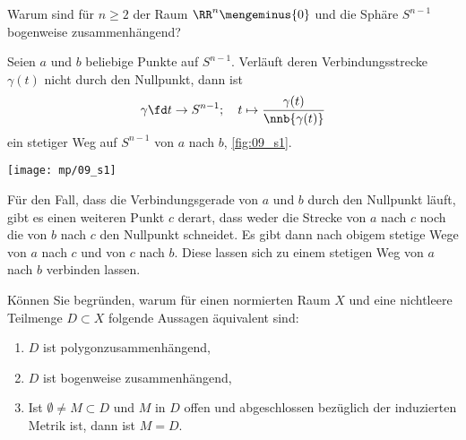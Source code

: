 \begin{frage}
  Warum sind für $n \ge 2$ der Raum $\RR^n \mengeminus \{ 0 \}$ und 
  die Sphäre $S^{n-1}$ bogenweise zusammenhängend?
\end{frage}

\begin{antwort}
  Seien $a$ und $b$ beliebige Punkte auf $S^{n-1}$. Verläuft 
  deren Verbindungsstrecke $\gamma(t)$ nicht durch den Nullpunkt, 
  dann ist 
  \[
  \gamma\fd t\to S^{n-1};\quad t \mapsto \frac{\gamma(t)}{ \nnb{\gamma(t)} } 
  \]
  ein stetiger Weg auf $S^{n-1}$ von $a$ nach $b$, \sieheAbbildung\ref{fig:09_s1}.

  \begin{center}
    \texttt{[image: mp/09\_s1]}
    \label{fig:09_s1}
  \end{center}

  Für den Fall, dass die Verbindungsgerade von $a$ und $b$ durch den Nullpunkt 
  läuft, gibt es einen weiteren Punkt $c$ derart, dass weder die Strecke 
  von $a$ nach $c$ noch die von $b$ nach $c$ den Nullpunkt 
  schneidet. Es gibt dann nach obigem 
  stetige Wege von $a$ nach $c$ und von $c$ nach $b$. Diese lassen
  sich zu einem stetigen Weg von $a$ nach $b$ verbinden lassen.
  \AntEnd
\end{antwort}

\begin{frage}
  Können Sie begründen, warum für einen normierten Raum $X$ und eine 
  nichtleere Teilmenge $D\subset X$ folgende Aussagen äquivalent sind:
  {\setlength{\labelsep}{5mm}
    \begin{enumerate}
    \item[\desc{a}] $D$ ist polygonzusammenhängend,\\[-3.5mm]
    \item[\desc{b}] $D$ ist bogenweise zusammenhängend,\\[-3.5mm]
    \item[\desc{c}] Ist $\emptyset \not=M \subset D$ und $M$ in $D$ offen 
      und abgeschlossen bezüglich der induzierten Metrik ist, dann ist $M=D$.
    \end{enumerate}}
\end{frage}


